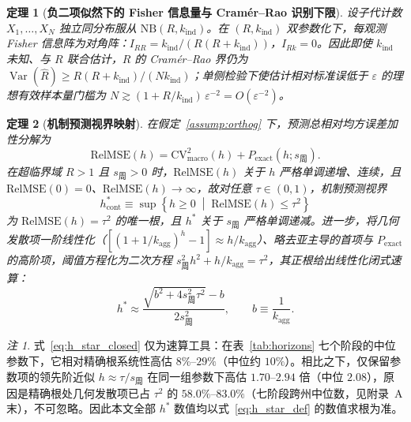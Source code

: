 \documentclass[10pt,UTF8,a4paper,zihao=-4]{ctexart}
\theoremstyle{plain}
\newtheorem{theorem}{定理}
\theoremstyle{remark}
\newtheorem{remark}{注}
\begin{document}
\begin{theorem}[\textbf{负二项似然下的 Fisher 信息量与 Cram\'er--Rao 识别下限}]\label{thm:fisher}
设子代计数 $X_1,\dots,X_N$ 独立同分布服从 $\text{NB}(R, k_{\text{ind}})$。在 $(R, k_{\text{ind}})$ 双参数化下，每观测 Fisher 信息阵为对角阵：$I_{RR} = k_{\text{ind}}/(R(R+k_{\text{ind}}))$，$I_{Rk}=0$。因此即使 $k_{\text{ind}}$ 未知、与 $R$ 联合估计，$R$ 的 Cram\'er--Rao 界仍为 $\operatorname{Var}(\hat{R}) \ge R(R+k_{\text{ind}})/(N k_{\text{ind}})$；单侧检验下使估计相对标准误低于 $\varepsilon$ 的理想有效样本量门槛为 $N \gtrsim (1 + R/k_{\text{ind}})\,\varepsilon^{-2} = O(\varepsilon^{-2})$。
\end{theorem}

\begin{theorem}[\textbf{机制预测视界映射}]\label{thm:horizon}
在假定~\ref{assump:orthog} 下，预测总相对均方误差加性分解为
\begin{equation}
\text{RelMSE}(h) = \text{CV}^2_{\text{macro}}(h) + P_{\text{exact}}(h;s_{\text{周}}).
\label{eq:relmse_additive}
\end{equation}
在超临界域 $R>1$ 且 $s_{\text{周}}>0$ 时，$\text{RelMSE}(h)$ 关于 $h$ 严格单调递增、连续，且 $\text{RelMSE}(0)=0$、$\text{RelMSE}(h)\to\infty$，故对任意 $\tau \in (0,1)$，机制预测视界
\begin{equation}
h^*_{\text{cont}} \equiv \sup\left\{h \ge 0 \;\middle|\; \text{RelMSE}(h) \le \tau^2\right\} \label{eq:h_star_def}
\end{equation}
为 $\text{RelMSE}(h) = \tau^2$ 的唯一根，且 $h^*$ 关于 $s_{\text{周}}$ 严格单调递减。进一步，将几何发散项一阶线性化（$[(1+1/k_{\text{agg}})^h - 1] \approx h/k_{\text{agg}}$）、略去亚主导的首项与 $P_{\text{exact}}$ 的高阶项，阈值方程化为二次方程 $s_{\text{周}}^2 h^2 + h/k_{\text{agg}} = \tau^2$，其正根给出线性化闭式速算：
\begin{equation}
h^* \approx \frac{\sqrt{b^2 + 4 s_{\text{周}}^2 \tau^2} - b}{2 s_{\text{周}}^2}, \qquad b \equiv \frac{1}{k_{\text{agg}}}. \label{eq:h_star_closed}
\end{equation}
\end{theorem}

\begin{remark}\label{rem:approx_accuracy}
式~\eqref{eq:h_star_closed} 仅为速算工具：在表~\ref{tab:horizons} 七个阶段的中位参数下，它相对精确根系统性高估 $8\%$--$29\%$（中位约 $10\%$）。相比之下，仅保留参数项的领先阶近似 $h \approx \tau/s_{\text{周}}$ 在同一组参数下高估 $1.70$--$2.94$ 倍（中位 $2.08$），原因是精确根处几何发散项已占 $\tau^2$ 的 $58.0\%$--$83.0\%$（七阶段跨州中位数，见附录~A 末），不可忽略。因此本文全部 $h^*$ 数值均以式~\eqref{eq:h_star_def} 的数值求根为准。
\end{remark}
\end{document}
